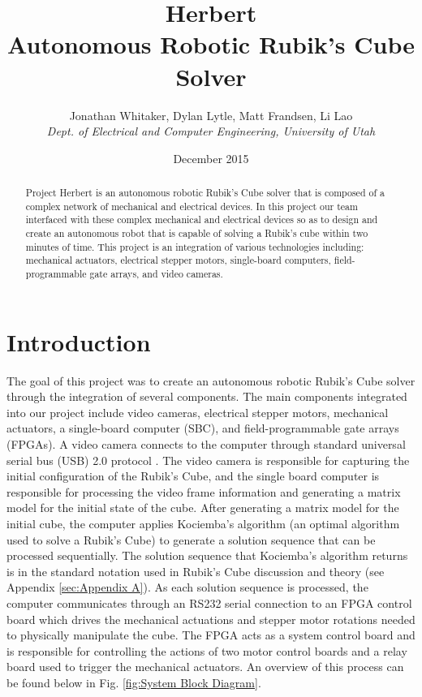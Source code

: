 \documentclass[final, letterpaper, 10 pt, conference, twocolumn]{IEEEtran}
\title{Herbert\\Autonomous Robotic Rubik's Cube Solver}
\author{
    Jonathan Whitaker, Dylan Lytle, Matt Frandsen, Li Lao\\
    \textit{Dept. of Electrical and Computer Engineering, University of Utah}\\
}
\date{December 2015}
\begin{document}
\maketitle

\begin{abstract}
Project Herbert is an autonomous robotic Rubik's Cube solver that is composed of a complex network of mechanical and electrical devices. In this project our team interfaced with these complex mechanical and electrical devices so as to design and create an autonomous robot that is capable of solving a Rubik's cube within two minutes of time.  This project is an integration of various technologies including: mechanical actuators, electrical stepper motors, single-board computers, field-programmable gate arrays, and video cameras.
\end{abstract}

\section{Introduction}
\label{sec:intro}
The goal of this project was to create an autonomous robotic Rubik's Cube solver through the integration of several components. The main components integrated into our project include video cameras, electrical stepper motors, mechanical actuators, a single-board computer (SBC), and field-programmable gate arrays (FPGAs). A video camera connects to the computer through standard universal serial bus (USB) 2.0 protocol \cite{USB2.0}. The video camera is responsible for capturing the initial configuration of the Rubik's Cube, and the single board computer is responsible for processing the video frame information and generating a matrix model for the initial state of the cube. After generating a matrix model for the initial cube, the computer applies Kociemba's algorithm \cite{Kociemba} (an optimal algorithm used to solve a Rubik's Cube) to generate a solution sequence that can be processed sequentially. The solution sequence that Kociemba's algorithm returns is in the standard notation used in Rubik's Cube discussion and theory (see Appendix \ref{sec:Appendix A}). As each solution sequence is processed, the computer communicates through an RS232 serial connection to an FPGA control board which drives the mechanical actuations and stepper motor rotations needed to physically manipulate the cube. The FPGA acts as a system control board and is responsible for controlling the actions of two motor control boards and a relay board used to trigger the mechanical actuators. An overview of this process can be found below in Fig. \ref{fig:System Block Diagram}.
\end{document}
